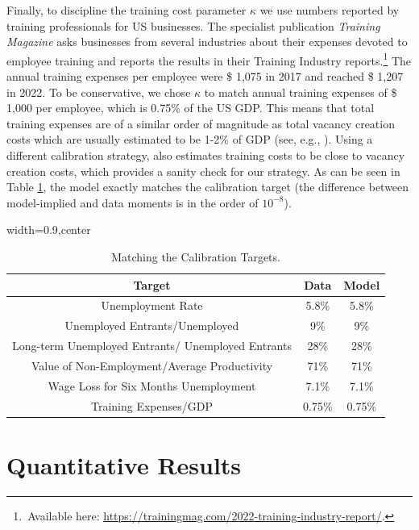 \documentclass[12pt]{article} %
\theoremstyle{definition}
\begin{document}
Finally, to discipline the training cost parameter $\kappa$ we use numbers reported by training professionals for US businesses.
The specialist publication \textit{Training Magazine} asks businesses from several industries about their expenses devoted to employee training and reports the results in their Training Industry reports.\footnote{\,Available here: \url{https://trainingmag.com/2022-training-industry-report/}.}
The annual training expenses per employee were \$ 1,075 in 2017 and reached \$ 1,207 in 2022.
To be conservative, we chose $\kappa$ to match annual training expenses of \$ 1,000 per employee, which is 0.75\% of the US GDP.
This means that total training expenses are of a similar order of magnitude as total vacancy creation costs which are usually estimated to be 1-2\% of GDP (see, e.g., \citealt{michaillat2021beveridgean}).
Using a different calibration strategy, \cite{masui2023provision} also estimates training costs to be close to vacancy creation costs, which provides a sanity check for our strategy.
As can be seen in Table \ref{table_calibration_targets}, the model exactly matches the calibration target (the difference between model-implied and data moments is in the order of $10^{-8}$).


\begin{table}[h!]
\centering
\begin{adjustbox}{width=0.9\columnwidth,center}

 \begin{tabular}{||c c c||} 
 \hline
 \textbf{Target} & \textbf{Data} & \textbf{Model} \\  
 \hline\hline
  Unemployment Rate & 5.8\%  & 5.8\% \\
  Unemployed Entrants/Unemployed & 9\% & 9\%  \\ 
  Long-term Unemployed Entrants/ Unemployed Entrants & 28\% & 28\% \\
  Value of Non-Employment/Average Productivity & 71\% & 71\% \\
  Wage Loss for Six Months Unemployment & 7.1\%  & 7.1\% \\
  Training Expenses/GDP & 0.75\% & 0.75\% \\ [1ex] 
 \hline
 \end{tabular}
\end{adjustbox}
  \caption{Matching the Calibration Targets.} \label{table_calibration_targets}
\end{table} 


\section{Quantitative Results}\label{section results} 
\end{document}
